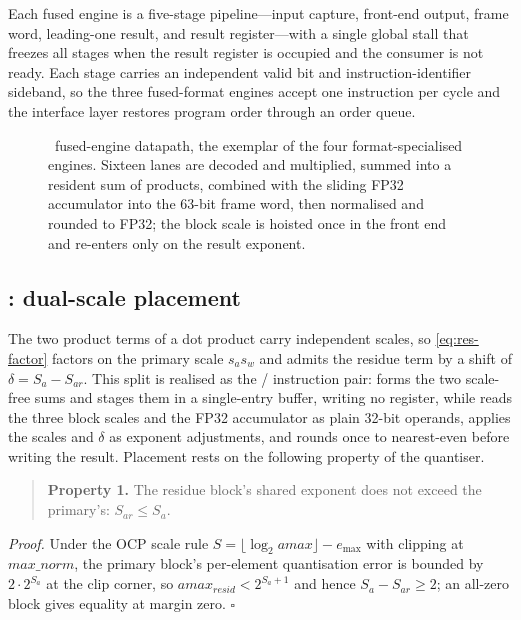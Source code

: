 Each fused engine is a five-stage pipeline---input capture, front-end output,
frame word, leading-one result, and result register---with a single global
stall that freezes all stages when the result register is occupied and the
consumer is not ready. Each stage carries an independent valid bit and
instruction-identifier sideband, so the three fused-format engines accept one
instruction per cycle and the interface layer restores program order through an
order queue.

\begin{figure}[t]
  \centering
  \resizebox{\columnwidth}{!}{}
\caption{\fpfour\ fused-engine datapath, the exemplar of the four
  format-specialised engines. Sixteen lanes are decoded and multiplied, summed
  into a resident sum of products, combined with the sliding FP32 accumulator
  into the 63-bit frame word, then normalised and rounded to FP32; the block
  scale is hoisted once in the front end and re-enters only on the result
  exponent.}
\end{figure}

\subsection{\fpfourres: dual-scale placement}
\label{sec:arch-residue}

The two product terms of a \fpfourres{} dot product carry independent scales, so
\eqref{eq:res-factor} factors on the primary scale $s_a s_w$ and admits the
residue term by a shift of $\delta = S_a - S_{ar}$. This split is realised as
the \MXDOTP/\MXFINAL{} instruction pair: \MXDOTP{} forms the two scale-free
sums and stages them in a single-entry buffer, writing no register, while
\MXFINAL{} reads the three block scales and the FP32 accumulator as plain
32-bit operands, applies the scales and $\delta$ as exponent adjustments, and
rounds once to nearest-even before writing the result. Placement rests on the
following property of the quantiser.

\begin{quote}
\textbf{Property 1.} The residue block's shared exponent does not exceed the
primary's: $S_{ar} \le S_a$.
\end{quote}

\emph{Proof.} Under the OCP scale rule
$S = \lfloor \log_2 \mathit{amax}\rfloor - e_{\max}$ with clipping at
$\mathit{max\_norm}$, the primary block's per-element quantisation error is
bounded by $2\cdot 2^{S_a}$ at the clip corner, so
$\mathit{amax}_{\mathit{resid}} < 2^{S_a+1}$ and hence $S_a - S_{ar} \ge 2$; an
all-zero block gives equality at margin zero. \hfill$\square$

